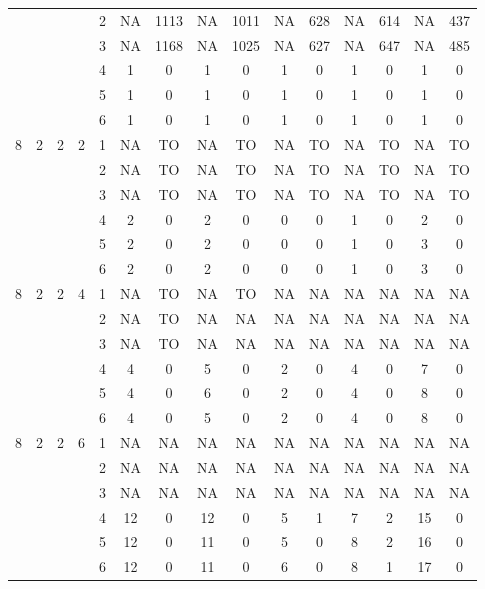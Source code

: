 \begin{longtable}{|c|c|c|c|c|c c|c c|c c|c c|c c|}
 & & & & 2 & NA & 1113 & NA & 1011 & NA & 628 & NA & 614 & NA & 437 \\
 & & & & 3 & NA & 1168 & NA & 1025 & NA & 627 & NA & 647 & NA & 485 \\
 & & & & 4 & 1 & 0 & 1 & 0 & 1 & 0 & 1 & 0 & 1 & 0 \\
 & & & & 5 & 1 & 0 & 1 & 0 & 1 & 0 & 1 & 0 & 1 & 0 \\
 & & & & 6 & 1 & 0 & 1 & 0 & 1 & 0 & 1 & 0 & 1 & 0 \\
\hline
\multirow{6}{*}{8} & \multirow{6}{*}{2} & \multirow{6}{*}{2} & \multirow{6}{*}{2} & 1 & NA & TO & NA & TO & NA & TO & NA & TO & NA & TO \\
 & & & & 2 & NA & TO & NA & TO & NA & TO & NA & TO & NA & TO \\
 & & & & 3 & NA & TO & NA & TO & NA & TO & NA & TO & NA & TO \\
 & & & & 4 & 2 & 0 & 2 & 0 & 0 & 0 & 1 & 0 & 2 & 0 \\
 & & & & 5 & 2 & 0 & 2 & 0 & 0 & 0 & 1 & 0 & 3 & 0 \\
 & & & & 6 & 2 & 0 & 2 & 0 & 0 & 0 & 1 & 0 & 3 & 0 \\
\hline
\multirow{6}{*}{8} & \multirow{6}{*}{2} & \multirow{6}{*}{2} & \multirow{6}{*}{4} & 1 & NA & TO & NA & TO & NA & NA & NA & NA & NA & NA \\
 & & & & 2 & NA & TO & NA & NA & NA & NA & NA & NA & NA & NA \\
 & & & & 3 & NA & TO & NA & NA & NA & NA & NA & NA & NA & NA \\
 & & & & 4 & 4 & 0 & 5 & 0 & 2 & 0 & 4 & 0 & 7 & 0 \\
 & & & & 5 & 4 & 0 & 6 & 0 & 2 & 0 & 4 & 0 & 8 & 0 \\
 & & & & 6 & 4 & 0 & 5 & 0 & 2 & 0 & 4 & 0 & 8 & 0 \\
\hline
\multirow{6}{*}{8} & \multirow{6}{*}{2} & \multirow{6}{*}{2} & \multirow{6}{*}{6} & 1 & NA & NA & NA & NA & NA & NA & NA & NA & NA & NA \\
 & & & & 2 & NA & NA & NA & NA & NA & NA & NA & NA & NA & NA \\
 & & & & 3 & NA & NA & NA & NA & NA & NA & NA & NA & NA & NA \\
 & & & & 4 & 12 & 0 & 12 & 0 & 5 & 1 & 7 & 2 & 15 & 0 \\
 & & & & 5 & 12 & 0 & 11 & 0 & 5 & 0 & 8 & 2 & 16 & 0 \\
 & & & & 6 & 12 & 0 & 11 & 0 & 6 & 0 & 8 & 1 & 17 & 0 \\
\hline
\end{longtable}
